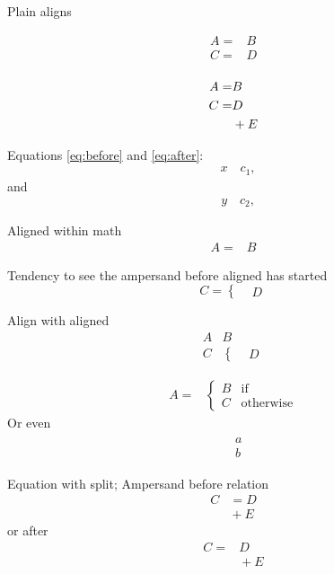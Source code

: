 \documentclass[a4paper]{book}
\begin{document}
Plain aligns

\begin{align}
A =& B \\
C =& D \\
\end{align}

\begin{align}
A =& B \\
C =& D \\
&+E \notag
\end{align}

Equations \eqref{eq:before} and \eqref{eq:after}:
\begin{align}
\label{eq:before}
&x \quad c_1,
\end{align}
and
\begin{align}
&y \quad c_2,
\label{eq:after}
\end{align}

Aligned within math
\[\begin{aligned}
    A =& B
  \end{aligned}
\]

Tendency to see the ampersand before aligned has started
\[
C =\left\{\begin{aligned}
& D \end{aligned}\right.
\]

Align with aligned
\begin{align*}
A & B\\
C &\left\{\begin{aligned}
& D \end{aligned}\right.
\end{align*}

\begin{align}
    A =& \left\{
\begin{aligned}
    B & \text{if}\\
    C & \text{otherwise}
  \end{aligned}\right.
 \end{align}
Or even
\begin{align}
\begin{aligned}
& a\\
& b
\end{aligned}
\end{align}
 
Equation with split; Ampersand before relation
\begin{equation}
\begin{split}
C &= D \\
&{}+E
\end{split}
\end{equation}
or after
\begin{equation}
\begin{split}
C =& D \\
&{}+E
\end{split}
\end{equation}
\end{document}
